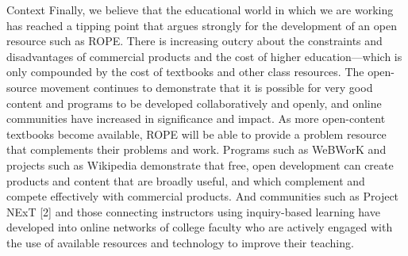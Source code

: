 \documentclass[11pt]{article}
\begin{document}
\begin{section}{Context}
Finally, we believe that the educational world in which we are working has
reached a tipping point that argues strongly for the development of an open
resource such as ROPE.  There is increasing outcry about the constraints
and disadvantages of commercial products and the cost of higher
education---which is only compounded by the cost of textbooks and other
class resources.  The open-source movement continues to demonstrate that
it is possible for very good content and programs to be
developed collaboratively and openly, and online communities have
increased in significance and impact. 
As more
open-content textbooks become available, ROPE will be able to provide a
problem resource that complements their problems and work.  Programs such
as WeBWorK and projects such as Wikipedia demonstrate that free, open
development can create products and content that are broadly useful, and
which complement and compete effectively with commercial products.  And
communities such as Project NExT [2] and those connecting instructors
using inquiry-based learning have developed into online networks of
college faculty who are actively engaged with the use of available
resources and technology to improve their teaching.

\end{section}
\end{document}
